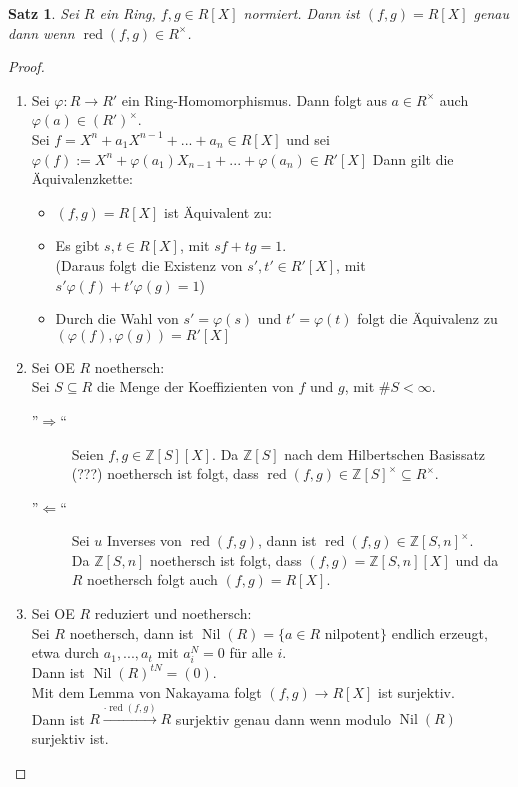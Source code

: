 \documentclass[10pt,a4paper]{article}
\newcommand{\Z}{\ensuremath{\mathbb{Z}}}
\newcommand{\Nil}{\ensuremath{\operatorname{Nil}}}
\newcommand{\res}{\ensuremath{\operatorname{red}}}
\newcounter{thm}[section]
\theoremstyle{definition}
\theoremstyle{plain}
\newtheorem{satz}[thm]{Satz}
\theoremstyle{remark}
\begin{document}
\begin{satz}
	Sei $R$ ein Ring, $f,g\in R[X]$ normiert. Dann ist $(f,g)=R[X]$ genau dann wenn $\res(f,g)\in R^\times$.
\end{satz}
\begin{proof}
	\begin{enumerate}
		\item Sei $\varphi:R\to R'$ ein Ring-Homomorphismus. Dann folgt aus $a\in R^\times$ auch $\varphi(a)\in(R')^\times$.\\
		Sei $f=X^n+a_1X^{n-1}+...+a_n\in R[X]$ und sei $\varphi(f):=X^n+\varphi(a_1)X_{n-1}+...+\varphi(a_n)\in R'[X]$ Dann gilt die Äquivalenzkette:
		\begin{itemize}
			\item $(f,g)=R[X]$ ist Äquivalent zu:
			\item Es gibt $s,t\in R[X]$, mit $sf+tg=1$.\\
			(Daraus folgt die Existenz von $s',t'\in R'[X]$, mit $s'\varphi(f)+t'\varphi(g)=1$)
			\item Durch die Wahl von $s'=\varphi(s)$ und $t'=\varphi(t)$ folgt die Äquivalenz zu $(\varphi(f),\varphi(g))=R'[X]$
		\end{itemize}
		\item Sei OE $R$ noethersch:\\
		Sei $S\subseteq R$ die Menge der Koeffizienten von $f$ und $g$, mit $\#S<\infty$.
		\begin{description}
			\item[''$\Rightarrow$``] Seien $f,g\in\Z[S][X]$.
			Da $\Z[S]$ nach dem Hilbertschen Basissatz (???) noethersch ist folgt, dass $\res(f,g)\in \Z[S]^\times\subseteq R^\times$.
			\item[''$\Leftarrow$``] Sei $u$ Inverses von $\res(f,g)$, dann ist $\res(f,g)\in \Z[S,n]^\times$.\\
			Da $\Z[S,n]$ noethersch ist folgt, dass $(f,g)=\Z[S,n][X]$ und da $R$ noethersch folgt auch $(f,g)=R[X]$.
		\end{description}
		\item Sei OE $R$ reduziert und noethersch:\\
		Sei $R$ noethersch, dann ist $\Nil(R)=\{\text{$a\in R$ nilpotent}\}$ endlich erzeugt, etwa durch $a_1,...,a_t$ mit $a_i^N=0$ für alle $i$.\\
		Dann ist $\Nil(R)^{tN}=(0)$.\\
		Mit dem Lemma von Nakayama folgt $(f,g)\to R[X]$ ist surjektiv.\\
		Dann ist $R\xrightarrow{\cdot \res(f,g)} R$ surjektiv genau dann wenn modulo $\Nil(R)$ surjektiv ist.\\

\end{enumerate}
\end{proof}
\end{document}
